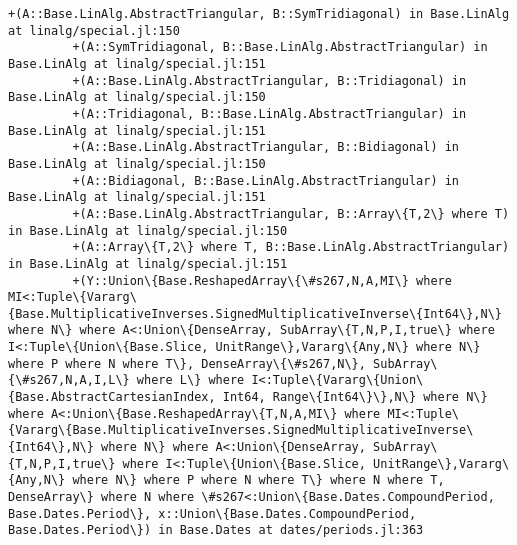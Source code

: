 \documentclass[11pt]{article}
\begin{document}
\begin{Verbatim}[commandchars=\\\{\}]
         +(A::Base.LinAlg.AbstractTriangular, B::SymTridiagonal) in Base.LinAlg at linalg/special.jl:150
         +(A::SymTridiagonal, B::Base.LinAlg.AbstractTriangular) in Base.LinAlg at linalg/special.jl:151
         +(A::Base.LinAlg.AbstractTriangular, B::Tridiagonal) in Base.LinAlg at linalg/special.jl:150
         +(A::Tridiagonal, B::Base.LinAlg.AbstractTriangular) in Base.LinAlg at linalg/special.jl:151
         +(A::Base.LinAlg.AbstractTriangular, B::Bidiagonal) in Base.LinAlg at linalg/special.jl:150
         +(A::Bidiagonal, B::Base.LinAlg.AbstractTriangular) in Base.LinAlg at linalg/special.jl:151
         +(A::Base.LinAlg.AbstractTriangular, B::Array\{T,2\} where T) in Base.LinAlg at linalg/special.jl:150
         +(A::Array\{T,2\} where T, B::Base.LinAlg.AbstractTriangular) in Base.LinAlg at linalg/special.jl:151
         +(Y::Union\{Base.ReshapedArray\{\#s267,N,A,MI\} where MI<:Tuple\{Vararg\{Base.MultiplicativeInverses.SignedMultiplicativeInverse\{Int64\},N\} where N\} where A<:Union\{DenseArray, SubArray\{T,N,P,I,true\} where I<:Tuple\{Union\{Base.Slice, UnitRange\},Vararg\{Any,N\} where N\} where P where N where T\}, DenseArray\{\#s267,N\}, SubArray\{\#s267,N,A,I,L\} where L\} where I<:Tuple\{Vararg\{Union\{Base.AbstractCartesianIndex, Int64, Range\{Int64\}\},N\} where N\} where A<:Union\{Base.ReshapedArray\{T,N,A,MI\} where MI<:Tuple\{Vararg\{Base.MultiplicativeInverses.SignedMultiplicativeInverse\{Int64\},N\} where N\} where A<:Union\{DenseArray, SubArray\{T,N,P,I,true\} where I<:Tuple\{Union\{Base.Slice, UnitRange\},Vararg\{Any,N\} where N\} where P where N where T\} where N where T, DenseArray\} where N where \#s267<:Union\{Base.Dates.CompoundPeriod, Base.Dates.Period\}, x::Union\{Base.Dates.CompoundPeriod, Base.Dates.Period\}) in Base.Dates at dates/periods.jl:363

\end{Verbatim}
\end{document}
